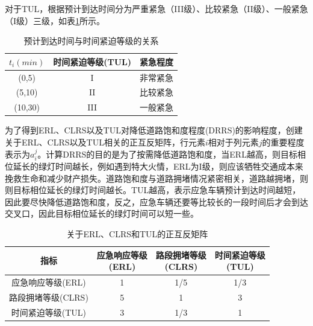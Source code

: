 对于TUL，根据预计到达时间分为严重紧急（III级）、比较紧急（II级）、一般紧急（I级）三级，如表\ref{table:TUL}所示。

\begin{table}[H]
	\centering
	\caption{预计到达时间与时间紧迫等级的关系}
	\label{table:TUL}
	\begin{tabular}{|c|c|c|}
		\hline
		${t_i}(min)$ & 时间紧迫等级(TUL) & 紧急程度 \\ \hline
		(0,5) & I & 非常紧急 \\ \hline
		(5,10) & II & 比较紧急 \\ \hline
		(10,30) & III & 一般紧急 \\ \hline
	\end{tabular}
\end{table}


为了得到ERL、CLRS以及TUL对降低道路饱和度程度(DRRS)的影响程度，创建关于ERL、CLRS以及TUL相关的正互反矩阵，行元素${i}$相对于列元素${j}$的重要程度表示为${a_i^j}$。计算DRRS的目的是为了按需降低道路饱和度，当ERL越高，则目标相位延长的绿灯时间越长，例如遇到特大火情，ERL为I级，则应该牺牲交通成本来挽救生命和减少财产损失。道路饱和度与道路拥堵情况紧密相关，道路越拥堵，则则目标相位延长的绿灯时间越长。TUL越高，表示应急车辆预计到达时间越短，因此要尽快降低道路饱和度，反之，应急车辆还要等比较长的一段时间后才会到达交叉口，因此目标相位延长的绿灯时间可以短一些。


\begin{table}[H]
	\centering
	\caption{关于ERL、CLRS和TUL的正互反矩阵}
	\label{table:juzhen}
	\begin{tabular}{|c|c|c|c|}
		\hline
		指标 & \tabincell{c}{应急响应等级\\(ERL)}  & \tabincell{c}{路段拥堵等级\\(CLRS)} & \tabincell{c}{时间紧迫等级\\(TUL)}  \\ \hline
		应急响应等级(ERL) & 1 & 1/5 & 1/3 \\ \hline
		路段拥堵等级(CLRS) & 5 & 1 & 3 \\ \hline
		时间紧迫等级(TUL) & 3 & 1/3 & 1 \\ \hline
	\end{tabular}
\end{table}

